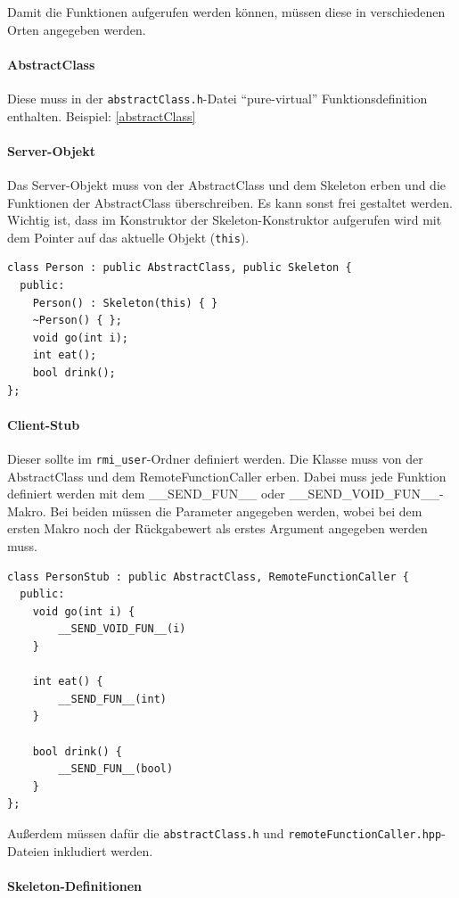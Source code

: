 \documentclass[a4paper,oneside,10pt]{report}
\begin{document}
Damit die Funktionen aufgerufen werden können, müssen diese in verschiedenen Orten angegeben werden. 


\paragraph{AbstractClass} Diese muss in der \texttt{abstractClass.h}-Datei "`pure-virtual"' Funktionsdefinition enthalten. Beispiel: \ref{abstractClass}
\paragraph{Server-Objekt} Das Server-Objekt muss von der AbstractClass und dem Skeleton erben und die Funktionen der AbstractClass überschreiben. Es kann sonst frei gestaltet werden. Wichtig ist, dass im Konstruktor der Skeleton-Konstruktor aufgerufen wird mit dem Pointer auf das aktuelle Objekt (\texttt{this}). 

\begin{lstlisting}
class Person : public AbstractClass, public Skeleton {
  public:
    Person() : Skeleton(this) { }
    ~Person() { };
    void go(int i);
    int eat();
    bool drink();
};
\end{lstlisting}

\paragraph{Client-Stub} Dieser sollte im \texttt{rmi\_user}-Ordner definiert werden. Die Klasse muss von der AbstractClass und dem RemoteFunctionCaller erben. Dabei muss jede Funktion definiert werden mit dem \_\_SEND\_FUN\_\_ oder \_\_SEND\_VOID\_FUN\_\_-Makro. Bei beiden müssen die Parameter angegeben werden, wobei bei dem ersten Makro noch der Rückgabewert als erstes Argument angegeben werden muss. 

\begin{lstlisting}
class PersonStub : public AbstractClass, RemoteFunctionCaller {
  public:
    void go(int i) {
        __SEND_VOID_FUN__(i)
    }

    int eat() {
        __SEND_FUN__(int)
    }

    bool drink() {
        __SEND_FUN__(bool)
    }
};
\end{lstlisting}

Außerdem müssen dafür die \texttt{abstractClass.h} und \texttt{remoteFunctionCaller.hpp}-Dateien inkludiert werden. 

\paragraph{Skeleton-Definitionen} \label{abstractMethods}
\end{document}

